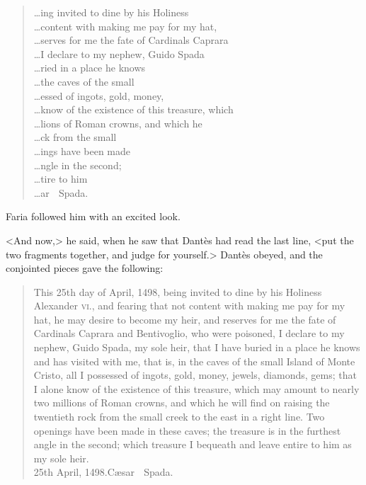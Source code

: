 \begin{quotation}\raggedleft\oldfont
 \dots ing invited to dine by his Holiness\\         
 \dots con\-tent with making me pay for my hat,\\    
 \dots serves for me the fate of Cardinals Cap\-ra\-ra\\            
 \dots I declare to my nephew, Guido Spada\\                       
 \dots ried in a place he knows\\                         
 \dots the caves of the small\\                  
 \dots essed of ingots, gold, money,\\  
 \dots know of the existence of this treasure, which\\            
 \dots lions of Roman crowns, and which he\\                              
 \dots ck from the small\\                            
 \dots ings have been made\\                            
 \dots ngle in the second;\\                                    
 \dots tire to him\\                                     
 \dots ar  Spada.\\
 \end{quotation}

 Faria followed him with an excited look. 

 <And now,> he said, when he saw that Dantès had read the last line, <put the two fragments together, and judge for yourself.> Dantès obeyed, and the conjointed pieces gave the following:  
 

\begin{quotation}\oldfont
 This 25th day of April, 1498, being invited to dine by his Holiness Alexander \textsc{vi.}, and fearing that not content with making me pay for my hat, he may desire to become my heir, and reserves for me the fate of Cardinals Caprara and Bentivoglio, who were poisoned, I declare to my nephew, Guido Spada, my sole heir, that I have buried in a place he knows and has visited with me, that is, in the caves of the small Island of Monte Cristo, all I possessed of ingots, gold, money, jewels, diamonds, gems; that I alone know of the existence of this treasure, which may amount to nearly two millions of Roman crowns, and which he will find on raising the twentieth rock from the small creek to the east in a right line. Two openings have been made in these caves; the treasure is in the furthest angle in the second; which treasure I bequeath and leave entire to him as my sole heir. \\
25th April, 1498.\hfill Cæsar  Spada.
 \end{quotation}


